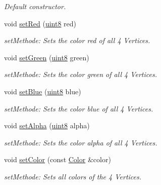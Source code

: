 \begin{DoxyCompactItemize}
\begin{DoxyCompactList}\small\item\em Default constructor. \item\end{DoxyCompactList}\item 
void \hyperlink{class_f2_c_1_1_sprite_element_a3a99ebcab976db9d2ccf759207ea534c}{setRed} (\hyperlink{namespace_f2_c_a711deb33697d145669b9c0c4fe87c7ca}{uint8} red)
\begin{DoxyCompactList}\small\item\em setMethode: Sets the color red of all 4 Vertices. \item\end{DoxyCompactList}\item 
void \hyperlink{class_f2_c_1_1_sprite_element_a8ab0a68bd984814a81afec23fa250bfc}{setGreen} (\hyperlink{namespace_f2_c_a711deb33697d145669b9c0c4fe87c7ca}{uint8} green)
\begin{DoxyCompactList}\small\item\em setMethode: Sets the color green of all 4 Vertices. \item\end{DoxyCompactList}\item 
void \hyperlink{class_f2_c_1_1_sprite_element_a283ac50f4fe67aac7028eb1fc1e0ae6d}{setBlue} (\hyperlink{namespace_f2_c_a711deb33697d145669b9c0c4fe87c7ca}{uint8} blue)
\begin{DoxyCompactList}\small\item\em setMethode: Sets the color blue of all 4 Vertices. \item\end{DoxyCompactList}\item 
void \hyperlink{class_f2_c_1_1_sprite_element_afb53f0d5935433775cefeee7b242fa16}{setAlpha} (\hyperlink{namespace_f2_c_a711deb33697d145669b9c0c4fe87c7ca}{uint8} alpha)
\begin{DoxyCompactList}\small\item\em setMethode: Sets the color alpha of all 4 Vertices. \item\end{DoxyCompactList}\item 
void \hyperlink{class_f2_c_1_1_sprite_element_a4df44dffcfef51f23b22fe578f2676d0}{setColor} (const \hyperlink{class_f2_c_1_1_color}{Color} \&color)
\begin{DoxyCompactList}\small\item\em setMethode: Sets all colors of the 4 Vertices. \item\end{DoxyCompactList}\item 

\end{DoxyCompactItemize}
